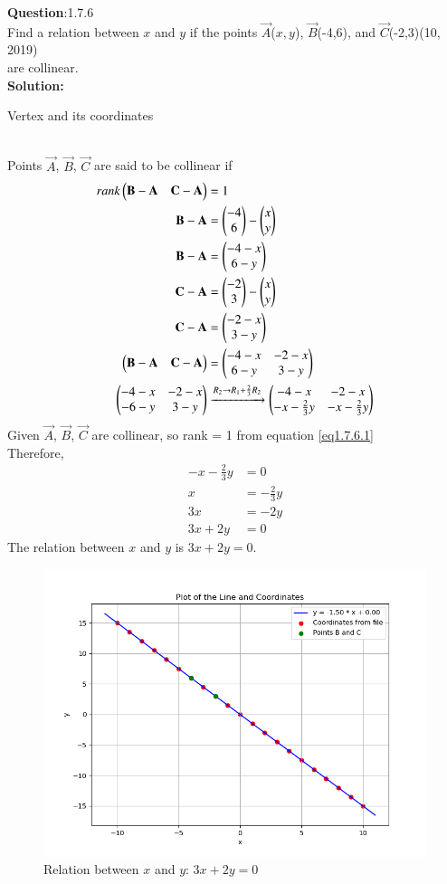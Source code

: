 \documentclass[journal]{IEEEtran}
\begin{document}
\textbf{Question}:1.7.6\\
Find a relation between $x$ and $y$ if the points $\vec{A}$($x,y$), $\vec{B}$(-4,6), and $\vec{C}$(-2,3)\hfill(10, 2019)\\ are collinear.
\\
\textbf{Solution:}
\renewcommand{\tablename}{Table 1.7.6.1}
\begin{table}[h!]
  \centering
  
  \caption{Vertex and its coordinates}
\end{table}
\\
 Points $\vec{A}$, $\vec{B}$, $\vec{C}$ are said to be collinear if
 \begin{align}
rank\begin{pmatrix}\mathbf{B} - \mathbf{A} & \mathbf{C} - \mathbf{A}\end{pmatrix} & = 1 \label{eq1.7.6.1} \\
	 \mathbf{B} - \mathbf{A} & = \begin{pmatrix}-4 \\ 6\end{pmatrix} - \begin{pmatrix}x \\ y\end{pmatrix} \\
	 \mathbf{B} - \mathbf{A} & = \begin{pmatrix}-4 - x \\ 6 - y\end{pmatrix} \\
	 \mathbf{C} - \mathbf{A} & = \begin{pmatrix}-2 \\ 3\end{pmatrix} - \begin{pmatrix}x \\ y\end{pmatrix} \\
	 \mathbf{C} - \mathbf{A} & = \begin{pmatrix}-2 - x \\ 3 - y\end{pmatrix} \\
	 \begin{pmatrix}\mathbf{B} - \mathbf{A} & \mathbf{C} - \mathbf{A}\end{pmatrix} & = \begin{pmatrix}-4 - x & -2 - x \\ 6 - y & 3 - y\end{pmatrix} \\
	 \begin{pmatrix}-4 - x & -2 - x \\ -6 - y & 3 - y\end{pmatrix} & \xrightarrow[]{R_2 \rightarrow R_1+\frac{2}{3}R_2} \begin{pmatrix}-4 - x & -2 - x \\ -x - \frac{2}{3}y & -x - \frac{2}{3}y\end{pmatrix}
     \end{align}
Given $\vec{A}$, $\vec{B}$, $\vec{C}$ are collinear, so rank = 1 from equation \ref{eq1.7.6.1} \\
Therefore,
\begin{align}
	-x - \frac{2}{3}y & = 0 \\
	x & = - \frac{2}{3}y \\
	3x & = -2y \\
	3x + 2y & = 0
\end{align}
The relation between $x$ and $y$ is $3x + 2y = 0$.
\begin{figure}[h!]
   \centering
   \includegraphics[width=0.7\linewidth]{figs/collinear.png}
   \caption{Relation between $x$ and $y$: $3x + 2y = 0$}
   \end{figure}
   
\end{document}
